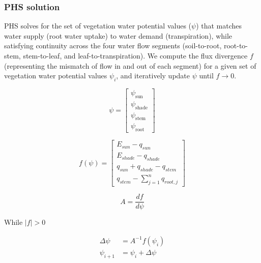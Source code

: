\documentclass[draft,linenumbers]{agujournal}
\begin{document}
    \subsubsection{PHS solution}
    \label{sect:solution}
    
    PHS solves for the set of vegetation water potential values ($\psi$) that matches water supply
    (root water uptake) to water demand (transpiration), while satisfying continuity across the four water flow
    segments (soil-to-root, root-to-stem, stem-to-leaf, and leaf-to-transpiration). 
    We compute the flux divergence $f$ (representing the mismatch of flow in and out of each segment)
    for a given set of vegetation water potential values $\psi_i$, and iteratively update $\psi$ until $f\to0$.
    
    \begin{linenomath*}
    \begin{equation} 
    \psi = \left[
    \begin{array}{c}
    \psi_{\text{sun}} \\ 
    \psi_{\text{shade}} \\ 
    \psi_{\text{stem}} \\ 
    \psi_{\text{root}}            
    \end{array} \right]
    \end{equation}
    \end{linenomath*}
    
    \begin{linenomath*}
    \begin{equation}
    f\left(\psi\right) = \left[ 
    \begin{array}{c}
    E_{sun}-q_{sun}\\
    E_{shade}-q_{shade}\\
    q_{sun}+q_{shade}-q_{stem}\\
    q_{stem}-\sum_{j=1}^n{q_{root,j}}
    \end{array} \right]
    \end{equation}
    \end{linenomath*}
    
    \begin{linenomath*}
    \begin{equation}
    A = \dfrac{df}{d\psi}
    \end{equation}
    \end{linenomath*}    
    
    While $\left|f\right|>0$
    \begin{linenomath*}
    \begin{equation} \begin{aligned}
    \label{eq:iter}
    \Delta\psi &=A^{-1}f\left(\psi_i\right) \\
    \psi_{i+1}  &= \psi_i + \Delta\psi
    \end{aligned} \end{equation}
    \end{linenomath*}    
    
\end{document}
